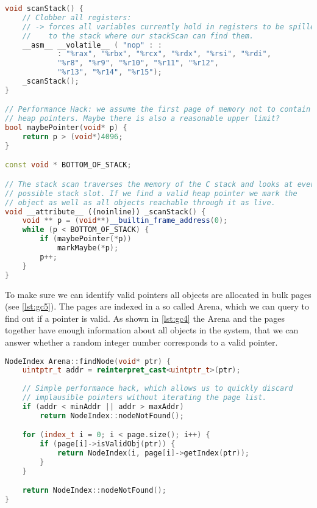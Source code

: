 \begin{lstlisting}[language=cpp, caption={Conservative stack scan.}, label={lst:gc3}]
void scanStack() {
    // Clobber all registers:
    // -> forces all variables currently hold in registers to be spilled
    //    to the stack where our stackScan can find them.
    __asm__ __volatile__ ( "nop" : :
            : "%rax", "%rbx", "%rcx", "%rdx", "%rsi", "%rdi",
            "%r8", "%r9", "%r10", "%r11", "%r12",
            "%r13", "%r14", "%r15");
    _scanStack();
}

// Performance Hack: we assume the first page of memory not to contain any
// heap pointers. Maybe there is also a reasonable upper limit?
bool maybePointer(void* p) {
    return p > (void*)4096;
}

const void * BOTTOM_OF_STACK;

// The stack scan traverses the memory of the C stack and looks at every
// possible stack slot. If we find a valid heap pointer we mark the
// object as well as all objects reachable through it as live.
void __attribute__ ((noinline)) _scanStack() {
    void ** p = (void**)__builtin_frame_address(0);
    while (p < BOTTOM_OF_STACK) {
        if (maybePointer(*p))
            markMaybe(*p);
        p++;
    }
}
\end{lstlisting}

To make sure we can identify valid pointers all objects are allocated in bulk pages (see \autoref{lst:gc5}). The pages are indexed in a so called Arena, which we can query to find out if a pointer is valid. As shown in \autoref{lst:gc4} the Arena and the pages together have enough information about all objects in the system, that we can answer whether a random integer number corresponds to a valid pointer.

\begin{lstlisting}[language=cpp, caption={Finding out if a random value is a valid pointer.}, label={lst:gc4}]
NodeIndex Arena::findNode(void* ptr) {
    uintptr_t addr = reinterpret_cast<uintptr_t>(ptr);
    
    // Simple performance hack, which allows us to quickly discard
    // implausible pointers without iterating the page list.
    if (addr < minAddr || addr > maxAddr)
        return NodeIndex::nodeNotFound();

    for (index_t i = 0; i < page.size(); i++) {
        if (page[i]->isValidObj(ptr)) {
            return NodeIndex(i, page[i]->getIndex(ptr));
        }
    }

    return NodeIndex::nodeNotFound();
}
\end{lstlisting}

